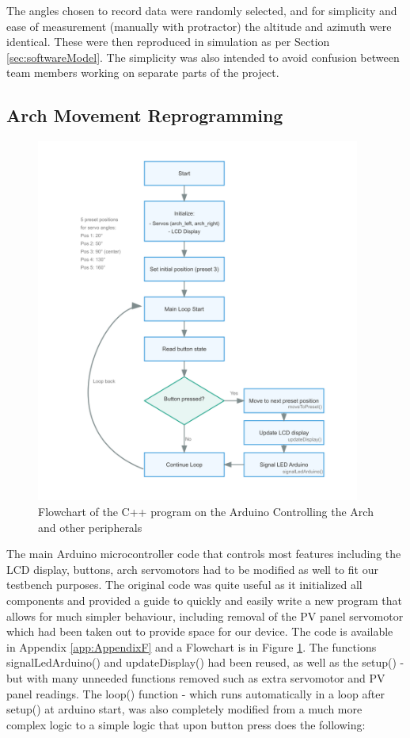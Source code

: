   
The angles chosen to record data were randomly selected, and for simplicity and ease of measurement (manually with protractor) the altitude and azimuth were identical. These were then reproduced in simulation as per Section \ref{sec:softwareModel}. The simplicity was also intended to avoid confusion between team members working on separate parts of the project.

\subsection{Arch Movement Reprogramming}
\begin{figure}[htbp] 
  \centering
  \includegraphics[width=0.95\textwidth]{chapters/methodology/RED/arch_flow.png}
  \caption{Flowchart of the C++ program on the Arduino Controlling the Arch and other peripherals}
  \label{fig:REDarchflowchart}
\end{figure}
The main Arduino microcontroller code that controls most features including the LCD display, buttons, arch servomotors had to be modified as well to fit our testbench purposes. The original code \cite{RefWorks:shopov2022renewable} was quite useful as it initialized all components and provided a guide to quickly and easily write a new program that allows for much simpler behaviour, including removal of the PV panel servomotor which had been taken out to provide space for our device. The code is available in Appendix \ref{app:AppendixF} and a Flowchart is in Figure \ref{fig:REDarchflowchart}. The functions signalLedArduino() and updateDisplay() had been reused, as well as the setup() - but with many unneeded functions removed such as extra servomotor and \ac{PV} panel readings. The loop() function - which runs automatically in a loop after setup() at arduino start, was also completely modified from a much more complex logic to a simple logic that upon button press does the following:
